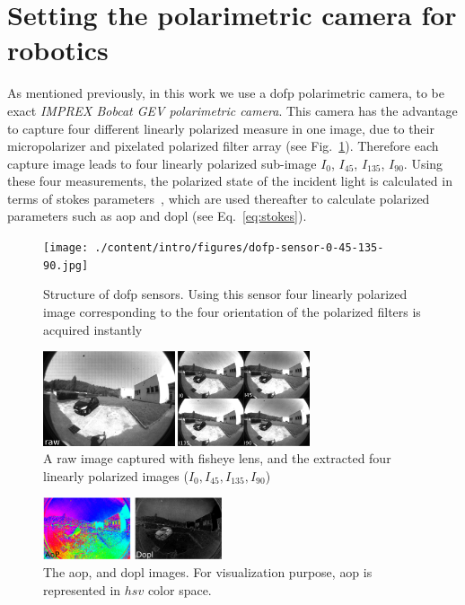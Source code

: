 \graphicspath{{./content/intro/figures/}}
\section{Setting the polarimetric camera for robotics}
\label{sec:rosify}

As mentioned previously, in this work we use a \gls{dofp} polarimetric camera,
to be exact \textit{IMPREX Bobcat GEV polarimetric camera}.
This camera has the advantage to capture four different linearly polarized
measure in one image, due to their micropolarizer and pixelated polarized
filter array (see Fig.~\ref{fig:dofp-sensor}).
Therefore each capture image leads to four linearly polarized sub-image $I_0$,
$I_{45}$, $I_{135}$, $I_{90}$.
Using these four measurements, the polarized state of the incident light is
calculated in terms of stokes parameters~\cite{goldstein2017polarized}, which
are used thereafter to calculate polarized parameters such as \gls{aop} and
\gls{dopl} (see Eq.~\ref{eq:stokes}).

\begin{figure}
  \centering
  \texttt{[image: ./content/intro/figures/dofp-sensor-0-45-135-90.jpg]}
  \caption{Structure of \gls{dofp} sensors. Using this sensor four linearly
    polarized image corresponding to the four orientation of the polarized
    filters is acquired instantly}
    \label{fig:dofp-sensor}
\end{figure}

\begin{figure}
  \centering
  \includegraphics[width=0.7\textwidth]{./content/intro/figures/raw-sp.jpg}
  \caption{A raw image captured with fisheye lens, and the extracted four
    linearly polarized images ($I_0, I_{45}, I_{135}, I_{90}$)}
  \label{fig:raw-sp}
\end{figure}

\begin{figure}
  \centering
  \includegraphics[width=0.47\textwidth]{./content/intro/figures/aop-dop.jpg}
  \caption{The \gls{aop}, and \gls{dopl} images. For visualization purpose,
    \gls{aop} is represented in $hsv$ color space.
    \label{fig:stokes-aop-dop}}
\end{figure}


